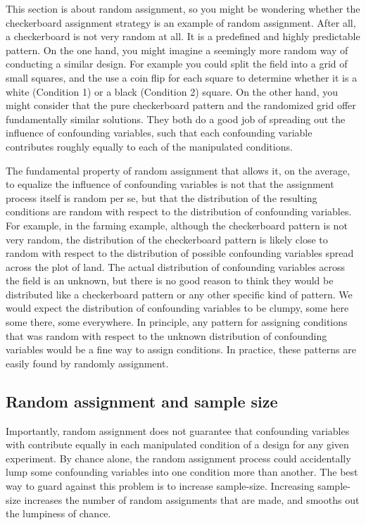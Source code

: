 This section is about random assignment, so you might be wondering whether the checkerboard assignment strategy is an example of random assignment. After all, a checkerboard is not very random at all. It is a predefined and highly predictable pattern. On the one hand, you might imagine a seemingly more random way of conducting a similar design. For example you could split the field into a grid of small squares, and the use a coin flip for each square to determine whether it is a white (Condition 1) or a black (Condition 2) square. On the other hand, you might consider that the pure checkerboard pattern and the randomized grid offer fundamentally similar solutions. They both do a good job of spreading out the influence of confounding variables, such that each confounding variable contributes roughly equally to each of the manipulated conditions.

The fundamental property of random assignment that allows it, on the average, to equalize the influence of confounding variables is not that the assignment process itself is random per se, but that the distribution of the resulting conditions are random with respect to the distribution of confounding variables. For example, in the farming example, although the checkerboard pattern is not very random, the distribution of the checkerboard pattern is likely close  to random with respect to the distribution of possible confounding variables spread across the plot of land. The actual distribution of confounding variables across the field is an unknown, but there is no good reason to think they would be distributed like a checkerboard pattern or any other specific kind of pattern. We would expect the distribution of confounding variables to be clumpy, some here some there, some everywhere. In principle, any pattern for assigning conditions that was random with respect to the unknown distribution of confounding variables would be a fine way to assign conditions. In practice, these patterns are easily found by randomly assignment.

\subsection{Random assignment and sample size}

Importantly, random assignment does not guarantee that confounding variables with contribute equally in each manipulated condition of a design for any given experiment. By chance alone, the random assignment process could accidentally lump some confounding variables into one condition more than another. The best way to guard against this problem is to increase sample-size. Increasing sample-size increases the number of random assignments that are made, and smooths out the lumpiness of chance.

